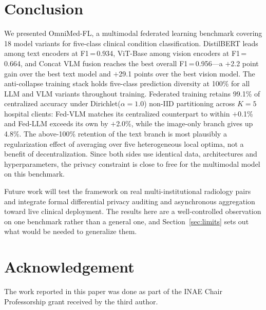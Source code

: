 \documentclass[letterpaper, conference]{IEEEtran}
\begin{document}
\section{Conclusion}
We presented OmniMed-FL, a multimodal federated learning benchmark covering 18
model variants for five-class clinical condition classification. DistilBERT leads
among text encoders at F1\,=\,0.934, ViT-Base among vision encoders at
F1\,=\,0.664, and Concat VLM fusion reaches the best overall
F1\,=\,0.956---a $+$2.2 point gain over the best text model and $+$29.1 points
over the best vision model. The anti-collapse training stack holds five-class
prediction diversity at 100\% for all LLM and VLM variants throughout training.
Federated training retains 99.1\% of centralized accuracy under
Dirichlet($\alpha{=}1.0$) non-IID partitioning across $K{=}5$ hospital clients:
Fed-VLM matches its centralized counterpart to within $+$0.1\% and Fed-LLM
exceeds its own by $+$2.0\%, while the image-only branch gives up 4.8\%. The
above-100\% retention of the text branch is most plausibly a regularization
effect of averaging over five heterogeneous local optima, not a benefit of
decentralization. Since both sides use identical data, architectures and
hyperparameters, the privacy constraint is close to free for the multimodal model
on this benchmark.

Future work will test the framework on real multi-institutional radiology pairs
and integrate formal differential privacy auditing and asynchronous aggregation
toward live clinical deployment. The results here are a well-controlled
observation on one benchmark rather than a general one, and
Section~\ref{sec:limits} sets out what would be needed to generalize them.

\FloatBarrier

\let\oldbibliography\thebibliography
\renewcommand{\thebibliography}[1]{%
  \oldbibliography{#1}%
  \scriptsize
  \setlength{\itemsep}{0pt}%
  \setlength{\parskip}{0pt}%
  \setlength{\topsep}{0pt}%
}

\section{Acknowledgement}
The work reported in this paper was done as part of the INAE Chair Professorship grant received by the third author.
\end{document}
